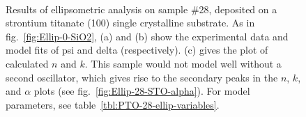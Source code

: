 \begin{figure}[htbp]
   \centering
   \hspace{0.5cm}
   \\
   \caption[Results of Ellipsometry on Sample \#28 on STO]%
   		{Results of ellipsometric analysis on sample \#28, deposited on a strontium titanate (100) single crystalline substrate. As in fig.~\ref{fig:Ellip-0-SiO2}, (a) and (b) show the experimental data and model fits of psi and delta (respectively). (c) gives the plot of calculated $n$ and $k$.  This sample would not model well without a second oscillator, which gives rise to the secondary peaks in the $n$, $k$, and $\alpha$ plots (see fig.~\vref{fig:Ellip-28-STO-alpha}). For model parameters, see table~\vref{tbl:PTO-28-ellip-variables}.}
		\label{fig:Ellip-28-STO}
\end{figure}

